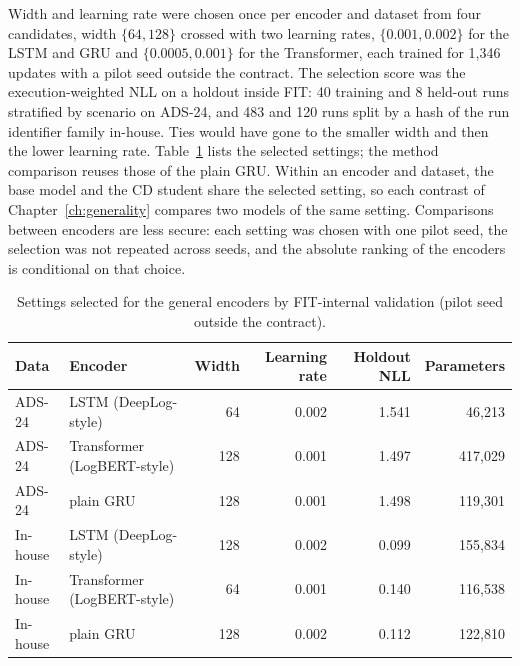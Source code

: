 Width and learning rate were chosen once per encoder and dataset from
four candidates, width $\{64, 128\}$ crossed with two learning rates,
$\{0.001, 0.002\}$ for the LSTM and GRU and $\{0.0005, 0.001\}$ for the
Transformer, each trained for 1,346 updates with a pilot seed outside
the contract. The selection score was the execution-weighted NLL on a
holdout inside FIT: 40 training and 8 held-out runs stratified by
scenario on ADS-24, and 483 and 120 runs split by a hash of the run
identifier family in-house. Ties would have gone to the smaller width
and then the lower learning rate. Table~\ref{tab:repro-encoders} lists
the selected settings; the method comparison reuses those of the plain
GRU. Within an encoder and dataset, the base model and the CD student
share the selected setting, so each contrast of
Chapter~\ref{ch:generality} compares two models of the same setting.
Comparisons between encoders are less secure: each setting was chosen
with one pilot seed, the selection was not repeated across seeds, and
the absolute ranking of the encoders is conditional on that choice.

\begin{table}[htbp]
\centering
\caption[Settings selected for the general encoders]{Settings selected for the general encoders by FIT-internal
validation (pilot seed outside the contract).}
\label{tab:repro-encoders}
\small
\begin{tabular}{@{}llrrrr@{}}
\toprule
Data & Encoder & Width & Learning rate & Holdout NLL & Parameters \\
\midrule
ADS-24   & LSTM (DeepLog-style)        & 64  & 0.002 & 1.541 & 46,213 \\
ADS-24   & Transformer (LogBERT-style) & 128 & 0.001 & 1.497 & 417,029 \\
ADS-24   & plain GRU                   & 128 & 0.001 & 1.498 & 119,301 \\
In-house & LSTM (DeepLog-style)        & 128 & 0.002 & 0.099 & 155,834 \\
In-house & Transformer (LogBERT-style) & 64  & 0.001 & 0.140 & 116,538 \\
In-house & plain GRU                   & 128 & 0.002 & 0.112 & 122,810 \\
\bottomrule
\end{tabular}
\end{table}

